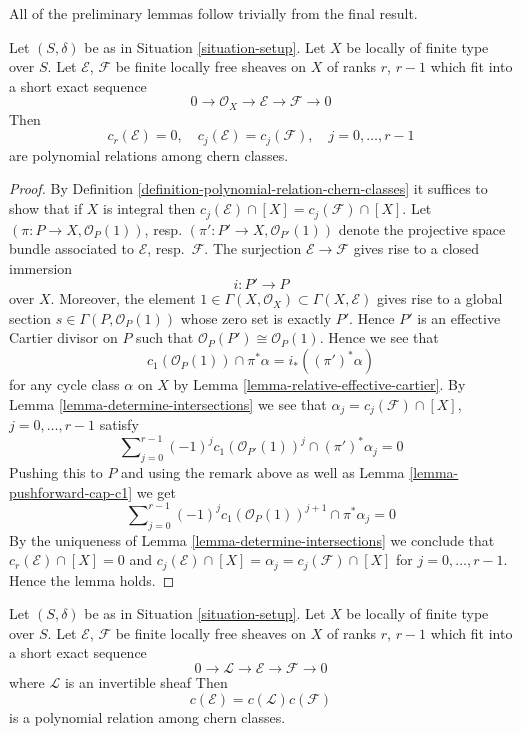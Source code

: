 \noindent
All of the preliminary lemmas follow trivially from the
final result.

\begin{lemma}
\label{lemma-get-rid-of-trivial-subbundle}
Let $(S, \delta)$ be as in Situation \ref{situation-setup}.
Let $X$ be locally of finite type over $S$.
Let $\mathcal{E}$, $\mathcal{F}$ be finite locally free sheaves
on $X$ of ranks $r$, $r - 1$ which fit into a short
exact sequence
$$
0 \to \mathcal{O}_X \to \mathcal{E} \to \mathcal{F} \to 0
$$
Then
$$
c_r(\mathcal{E}) = 0, \quad
c_j(\mathcal{E}) = c_j(\mathcal{F}), \quad j = 0, \ldots, r - 1
$$
are polynomial relations among chern classes.
\end{lemma}

\begin{proof}
By Definition \ref{definition-polynomial-relation-chern-classes}
it suffices to show that if $X$ is integral
then $c_j(\mathcal{E}) \cap [X] = c_j(\mathcal{F}) \cap [X]$.
Let $(\pi : P \to X, \mathcal{O}_P(1))$,
resp. $(\pi' : P' \to X, \mathcal{O}_{P'}(1))$ denote the
projective space bundle associated to $\mathcal{E}$, resp.\ $\mathcal{F}$.
The surjection $\mathcal{E} \to \mathcal{F}$ gives rise
to a closed immersion
$$
i : P' \longrightarrow P
$$
over $X$. Moreover, the element
$1 \in \Gamma(X, \mathcal{O}_X) \subset \Gamma(X, \mathcal{E})$
gives rise to a global section $s \in \Gamma(P, \mathcal{O}_P(1))$
whose zero set is exactly $P'$. Hence $P'$ is an effective Cartier
divisor on $P$ such that $\mathcal{O}_P(P') \cong \mathcal{O}_P(1)$.
Hence we see that
$$
c_1(\mathcal{O}_P(1)) \cap \pi^*\alpha = i_*((\pi')^*\alpha)
$$
for any cycle class $\alpha$ on $X$ by
Lemma \ref{lemma-relative-effective-cartier}.
By Lemma \ref{lemma-determine-intersections} we see that
$\alpha_j = c_j(\mathcal{F}) \cap [X]$, $j = 0, \ldots, r - 1$
satisfy
$$
\sum\nolimits_{j = 0}^{r - 1} (-1)^jc_1(\mathcal{O}_{P'}(1))^j
\cap (\pi')^*\alpha_j = 0
$$
Pushing this to $P$ and using the remark above as well as
Lemma \ref{lemma-pushforward-cap-c1} we get
$$
\sum\nolimits_{j = 0}^{r - 1}
(-1)^j c_1(\mathcal{O}_P(1))^{j + 1}
\cap \pi^*\alpha_j = 0
$$
By the uniqueness of Lemma \ref{lemma-determine-intersections}
we conclude that
$c_r(\mathcal{E}) \cap [X] = 0$ and
$c_j(\mathcal{E}) \cap [X] = \alpha_j = c_j(\mathcal{F}) \cap [X]$
for $j = 0, \ldots, r - 1$. Hence the lemma holds.
\end{proof}

\begin{lemma}
\label{lemma-additivity-invertible-subsheaf}
Let $(S, \delta)$ be as in Situation \ref{situation-setup}.
Let $X$ be locally of finite type over $S$.
Let $\mathcal{E}$, $\mathcal{F}$ be finite locally free sheaves
on $X$ of ranks $r$, $r - 1$ which fit into a short
exact sequence
$$
0 \to \mathcal{L} \to \mathcal{E} \to \mathcal{F} \to 0
$$
where $\mathcal{L}$ is an invertible sheaf
Then
$$
c(\mathcal{E}) = c(\mathcal{L}) c(\mathcal{F})
$$
is a polynomial relation among chern classes.
\end{lemma}

